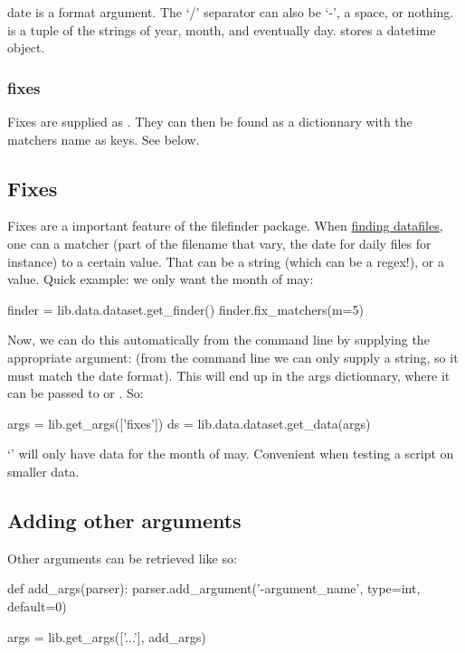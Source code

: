 date is a  format argument. The `/' separator can also be `-', a space, or nothing.
 is a tuple of the strings of year, month, and eventually day\@.  stores a datetime object.

\subsubsection{fixes}
Fixes are supplied as . They can then be found as a dictionnary with the matchers name as keys. %
See  below.

\subsection{Fixes}
\label{sec:org-fixes}
Fixes are a important feature of the filefinder package.
When \hyperref[sec:org-preregex]{finding datafiles}, one can  a matcher (part of the filename that vary, the date for daily files for instance) to a certain value.
That can be a string (which can be a regex!), or a value. Quick example: we only want the month of may:
\begin{python}
finder = lib.data.dataset.get_finder()
finder.fix_matchers(m=5)
\end{python}

Now, we can do this automatically from the command line by supplying the appropriate argument:  (from the command line we can only supply a string, so it must match the date format). This will end up in the args dictionnary, where it can be passed to  or . So:
\begin{python}
args = lib.get_args(['fixes'])
ds = lib.data.dataset.get_data(args)
\end{python}
`' will only have data for the month of may. Convenient when testing a script on smaller data.

\subsection{Adding other arguments}
Other arguments can be retrieved like so:
\begin{python}
def add_args(parser):
    parser.add_argument('-argument_name', type=int, default=0)

args = lib.get_args(['...'], add_args)
\end{python}

